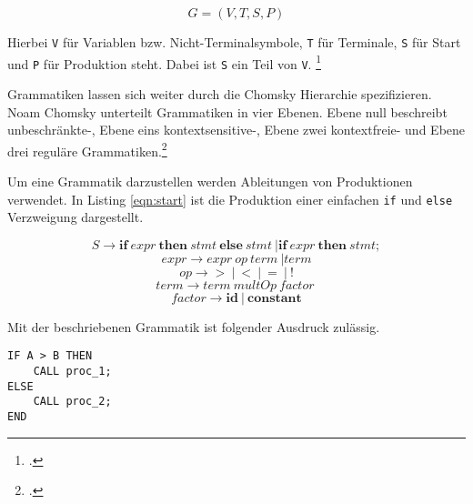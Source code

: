 \begin{center}
\begin{equation}\label{eqn:grammar}
G=(V,T,S,P)
\end{equation}
\end{center}

Hierbei \verb+V+ für Variablen bzw. Nicht-Terminalsymbole, \verb+T+ für Terminale, \verb+S+ für Start und \verb+P+ für Produktion steht. Dabei ist \verb+S+ ein Teil von \verb+V+.  \footcite[Vgl. ][S. 31ff. ]{automata}

Grammatiken lassen sich weiter durch die Chomsky Hierarchie spezifizieren. Noam Chomsky unterteilt Grammatiken in vier Ebenen. Ebene null beschreibt unbeschränkte-, Ebene eins kontextsensitive-, Ebene zwei kontextfreie- und Ebene drei reguläre Grammatiken.\footcite[Vgl. ][]{chomsky}

\pagebreak

Um eine Grammatik darzustellen werden Ableitungen von Produktionen verwendet. In Listing \ref{eqn:start} ist die Produktion einer einfachen \verb+if+ und \verb+else+ Verzweigung dargestellt.

\begin{center}
\begin{equation}\label{eqn:start}
S \to \mathbf{if}\: expr\: \mathbf{then}\: stmt\: \mathbf{else}\: stmt\: | \mathbf{if}\: expr\: \mathbf{then}\: stmt;
\end{equation}
\begin{equation}
expr \to expr\: op\: term\: | term
\end{equation}
\begin{equation}
op \to \mathbf{>}\: |\: \mathbf{<}\: |\: \mathbf{=}\: |\: \mathbf{!}
\end{equation}
\begin{equation}
term \to term\: multOp\: factor\:
\end{equation}
\begin{equation}
factor \to \mathbf{id}\: |\: \mathbf{constant} 
\end{equation}
\end{center}
 
Mit der beschriebenen Grammatik ist folgender Ausdruck zulässig.

\begin{lstlisting}[language=PL/I, caption=If Statement PL/I, label={lst:pliifstatement}]
IF A > B THEN 
	CALL proc_1;
ELSE 
	CALL proc_2;
END
\end{lstlisting}

